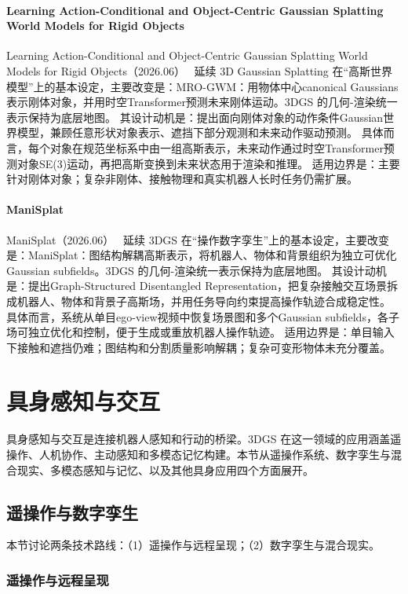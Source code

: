 \paragraph{Learning Action-Conditional and Object-Centric Gaussian Splatting World Models for Rigid Objects}
Learning Action-Conditional and Object-Centric Gaussian Splatting World Models for Rigid Objects（2026.06）~\cite{2606_01950} 延续 3D Gaussian Splatting 在“高斯世界模型”上的基本设定，主要改变是：MRO-GWM：用物体中心canonical Gaussians表示刚体对象，并用时空Transformer预测未来刚体运动。3DGS 的几何-渲染统一表示保持为底层地图。
其设计动机是：提出面向刚体对象的动作条件Gaussian世界模型，兼顾任意形状对象表示、遮挡下部分观测和未来动作驱动预测。
具体而言，每个对象在规范坐标系中由一组高斯表示，未来动作通过时空Transformer预测对象SE(3)运动，再把高斯变换到未来状态用于渲染和推理。
适用边界是：主要针对刚体对象；复杂非刚体、接触物理和真实机器人长时任务仍需扩展。

\paragraph{ManiSplat}
ManiSplat（2026.06）~\cite{2606_10645} 延续 3DGS 在“操作数字孪生”上的基本设定，主要改变是：ManiSplat：图结构解耦高斯表示，将机器人、物体和背景组织为独立可优化Gaussian subfields。3DGS 的几何-渲染统一表示保持为底层地图。
其设计动机是：提出Graph-Structured Disentangled Representation，把复杂接触交互场景拆成机器人、物体和背景子高斯场，并用任务导向约束提高操作轨迹合成稳定性。
具体而言，系统从单目ego-view视频中恢复场景图和多个Gaussian subfields，各子场可独立优化和控制，便于生成或重放机器人操作轨迹。
适用边界是：单目输入下接触和遮挡仍难；图结构和分割质量影响解耦；复杂可变形物体未充分覆盖。
\section{具身感知与交互}
\label{sec:17_3}

具身感知与交互是连接机器人感知和行动的桥梁。3DGS 在这一领域的应用涵盖遥操作、人机协作、主动感知和多模态记忆构建。本节从遥操作系统、数字孪生与混合现实、多模态感知与记忆、以及其他具身应用四个方面展开。

\subsection{遥操作与数字孪生}
\label{ss:17_3a}

本节讨论两条技术路线：（1）遥操作与远程呈现；（2）数字孪生与混合现实。

\subsubsection{遥操作与远程呈现}

